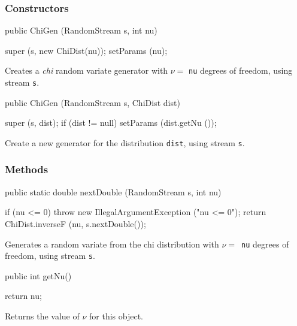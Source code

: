 \subsubsection* {Constructors}

\begin{code}

   public ChiGen (RandomStream s, int nu) \begin{hide} {
      super (s, new ChiDist(nu));
      setParams (nu);
   }\end{hide}
\end{code} 
\begin{tabb}  Creates a \emph{chi}  random variate generator with 
 $\nu =$ \texttt{nu} degrees of freedom, using stream \texttt{s}. 
\end{tabb}
\begin{code}

   public ChiGen (RandomStream s, ChiDist dist) \begin{hide} {
      super (s, dist);
      if (dist != null)
         setParams (dist.getNu ());
   }\end{hide}
\end{code}
  \begin{tabb}  Create a new generator for the distribution \texttt{dist},
    using stream \texttt{s}. 
  \end{tabb}

\subsubsection* {Methods}
\begin{code}

   public static double nextDouble (RandomStream s, int nu)\begin{hide} {
      if (nu <= 0)
         throw new IllegalArgumentException ("nu <= 0");
      return ChiDist.inverseF (nu, s.nextDouble());
   }\end{hide}
\end{code}
\begin{tabb}
   Generates a random variate from the chi distribution with $\nu = $~\texttt{nu}
   degrees of freedom, using stream \texttt{s}.
\end{tabb}
\begin{code} 
     
   public int getNu()\begin{hide} {
      return nu;
   }
\end{hide}
\end{code}
\begin{tabb}
  Returns the value of $\nu$ for this object.
\end{tabb}
\begin{hide}\begin{code} 
     
   protected void setParams (int nu) {
      if (nu <= 0)
         throw new IllegalArgumentException ("nu <= 0");
      this.nu = nu;
   }
}
\end{code}
\end{hide}
